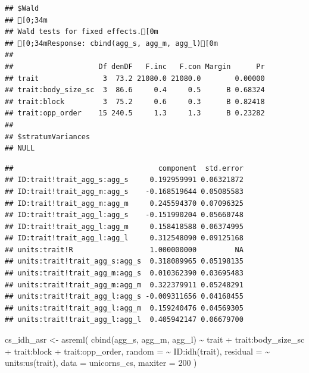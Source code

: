 \documentclass[
  12pt,
]{book}
\newenvironment{Shaded}{\begin{snugshade}}{\end{snugshade}}
\newcommand{\AttributeTok}[1]{\textcolor[rgb]{0.77,0.63,0.00}{#1}}
\newcommand{\DecValTok}[1]{\textcolor[rgb]{0.00,0.00,0.81}{#1}}
\newcommand{\FunctionTok}[1]{\textcolor[rgb]{0.00,0.00,0.00}{#1}}
\newcommand{\NormalTok}[1]{#1}
\newcommand{\OtherTok}[1]{\textcolor[rgb]{0.56,0.35,0.01}{#1}}
\newcommand{\SpecialCharTok}[1]{\textcolor[rgb]{0.00,0.00,0.00}{#1}}
\newcommand{\StringTok}[1]{\textcolor[rgb]{0.31,0.60,0.02}{#1}}
\begin{document}
\begin{verbatim}
## $Wald
## [0;34m
## Wald tests for fixed effects.[0m
## [0;34mResponse: cbind(agg_s, agg_m, agg_l)[0m
## 
##                    Df denDF   F.inc   F.con Margin      Pr
## trait               3  73.2 21080.0 21080.0        0.00000
## trait:body_size_sc  3  86.6     0.4     0.5      B 0.68324
## trait:block         3  75.2     0.6     0.3      B 0.82418
## trait:opp_order    15 240.5     1.3     1.3      B 0.23282
## 
## $stratumVariances
## NULL
\end{verbatim}

\begin{Shaded}
\end{Shaded}

\begin{verbatim}
##                                  component  std.error
## ID:trait!trait_agg_s:agg_s     0.192959991 0.06321872
## ID:trait!trait_agg_m:agg_s    -0.168519644 0.05085583
## ID:trait!trait_agg_m:agg_m     0.245594370 0.07096325
## ID:trait!trait_agg_l:agg_s    -0.151990204 0.05660748
## ID:trait!trait_agg_l:agg_m     0.158418588 0.06374995
## ID:trait!trait_agg_l:agg_l     0.312548090 0.09125168
## units:trait!R                  1.000000000         NA
## units:trait!trait_agg_s:agg_s  0.318089965 0.05198135
## units:trait!trait_agg_m:agg_s  0.010362390 0.03695483
## units:trait!trait_agg_m:agg_m  0.322379911 0.05248291
## units:trait!trait_agg_l:agg_s -0.009311656 0.04168455
## units:trait!trait_agg_l:agg_m  0.159240476 0.04569305
## units:trait!trait_agg_l:agg_l  0.405942147 0.06679700
\end{verbatim}

\begin{Shaded}
\begin{Highlighting}[]
\NormalTok{cs\_idh\_asr }\OtherTok{\textless{}{-}} \FunctionTok{asreml}\NormalTok{(}
  \FunctionTok{cbind}\NormalTok{(agg\_s, agg\_m, agg\_l) }\SpecialCharTok{\textasciitilde{}}\NormalTok{ trait }\SpecialCharTok{+}\NormalTok{ trait}\SpecialCharTok{:}\NormalTok{body\_size\_sc }\SpecialCharTok{+}
\NormalTok{    trait}\SpecialCharTok{:}\NormalTok{block }\SpecialCharTok{+}
\NormalTok{    trait}\SpecialCharTok{:}\NormalTok{opp\_order,}
  \AttributeTok{random =} \SpecialCharTok{\textasciitilde{}}\NormalTok{ ID}\SpecialCharTok{:}\FunctionTok{idh}\NormalTok{(trait),}
  \AttributeTok{residual =} \SpecialCharTok{\textasciitilde{}}\NormalTok{ units}\SpecialCharTok{:}\FunctionTok{us}\NormalTok{(trait),}
  \AttributeTok{data =}\NormalTok{ unicorns\_cs,}
  \AttributeTok{maxiter =} \DecValTok{200}
\NormalTok{)}
\end{Highlighting}
\end{Shaded}
\end{document}
